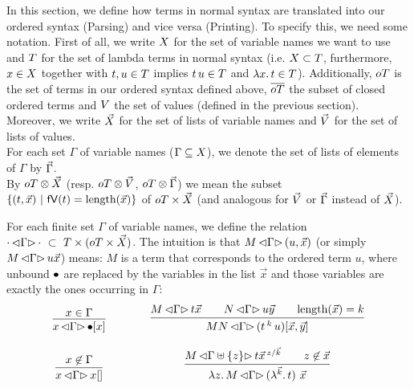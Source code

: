 \documentclass[submission,copyright,creativecommons]{eptcs}
\begin{document}
In this section, we define how terms in normal syntax are translated into our ordered syntax (Parsing) and vice versa (Printing). 
To specify this, we need some notation. 
First of all, we write $X$ for the set of variable names we want to use and $T$ for the set of lambda terms in normal syntax (i.e. $X \subset T$, furthermore, $x \in X$ together with $t, u \in T$ implies $t \, u \in T$ and $\lambda {x}. \, t \in T$). Additionally, $oT$ is the set of terms in our ordered syntax defined above, $\overline{oT}$ the subset of closed ordered terms and $V$ the set of values (defined in the previous section).
Moreover, we write $\vec {X}$ for the set of lists of variable names and $\vec {V}$ for the set of lists of values. 
\\
For each set $\Gamma$ of variable names ($\Gamma \subseteq X$), we denote the set of lists of elements of $\Gamma$ by $\vec \Gamma$. 
\\
By $oT \otimes \vec {X}$ (resp. $oT \otimes \vec {V}$, $oT \otimes \vec \Gamma$) we mean the subset $\{(t, \vec x) \ | \ \mathsf{fV}(t) = \mbox{length}(\vec x) \}$ of $oT \times \vec {X}$ (and analogous for $\vec {V}$ or $\vec \Gamma$ instead of $\vec {X}$).
\\
\begin{defin}
For each finite %
set $\Gamma$ of variable names, we define the relation
$\cdot \, { \mathord{\lhd} {\Gamma} \mathord{\rhd} } \, \cdot \ \subset \  T \times (oT \times \vec {X})$.
The intuition is that $M \, { \mathord{\lhd} {\Gamma} \mathord{\rhd} } \, (u, \vec x)$ (or simply $M \, { \mathord{\lhd} {\Gamma} \mathord{\rhd} } \, u \vec x$) means: $M$ is a term that corresponds to the ordered term $u$, where unbound $\mathord{\bullet}$ are replaced by the variables in the list $\vec x$ and those variables are exactly the ones occurring in $\Gamma$:
\[
\begin{array}{c@{\qquad\qquad} c}
\infru{x \in \Gamma}{\parse x \Gamma {\ovar \ve x}}
&
\infru{ {\parse M \Gamma {t \vec x}} \qquad {\parse N \Gamma {u \vec y}} \qquad {\length{\vec x} = k} } {\parse {MN} {\Gamma} {(\ApO t k u) [\vec x, \vec y]} } 
\\ \\
\infru{x \not\in \Gamma}{\parse x \Gamma {x \emptyVec}}
&
\infru{ 
         {\parse M { \Gamma \uplus \{z\} } {       t \multiinsert{\vec x}{\vec k}{z}   }} 
          \qquad 
          z \not\in \vec x  }
          {\parse {\LaA z M} {\Gamma} {(\LaO {\vec{k}} t) \ \vec x}}
\end{array}
\]


\end{defin}
\end{document}
